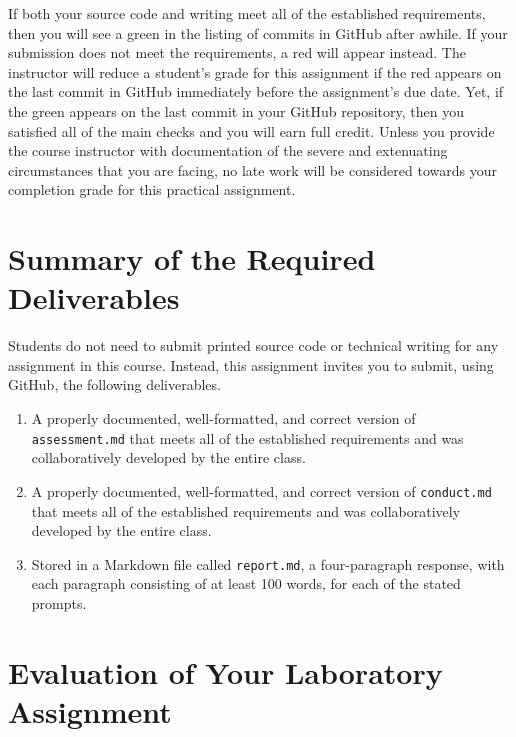 \documentclass[11pt]{article}
\newcommand{\assessment}{\lstinline{assessment.md}}
\newcommand{\conduct}{\lstinline{conduct.md}}
\newcommand{\reflection}{\lstinline{report.md}}
\newcommand{\checkmark}{\ding{51}}
\newcommand{\naughtmark}{\ding{55}}
\begin{document}
If both your source code and writing meet all of the established requirements,
then you will see a green \checkmark{} in the listing of commits in GitHub after
awhile. If your submission does not meet the requirements, a red \naughtmark{}
will appear instead. The instructor will reduce a student's grade for this
assignment if the red \naughtmark{} appears on the last commit in GitHub
immediately before the assignment's due date. Yet, if the green \checkmark{}
appears on the last commit in your GitHub repository, then you satisfied all of
the main checks and you will earn full credit. Unless you provide the course
instructor with documentation of the severe and extenuating circumstances that
you are facing, no late work will be considered towards your completion grade
for this practical assignment.

\section*{Summary of the Required Deliverables}

\noindent Students do not need to submit printed source code or technical
writing for any assignment in this course. Instead, this assignment invites you
to submit, using GitHub, the following deliverables.

\begin{enumerate}

\setlength{\itemsep}{0in}

\item A properly documented, well-formatted, and correct version of
  \assessment{} that meets all of the established requirements and was
  collaboratively developed by the entire class.

\item A properly documented, well-formatted, and correct version of
  \conduct{} that meets all of the established requirements and was
  collaboratively developed by the entire class.

\item Stored in a Markdown file called \reflection{}, a four-paragraph response,
  with each paragraph consisting of at least 100 words, for each of the stated
  prompts.

\end{enumerate}

\section*{Evaluation of Your Laboratory Assignment}
\end{document}
